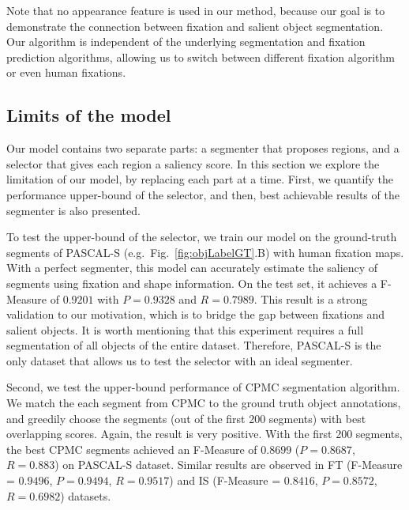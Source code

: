 Note that no appearance feature is used in our method, because our goal is to demonstrate the connection between fixation and salient object segmentation.  Our algorithm is independent of the underlying segmentation and fixation prediction algorithms, allowing us to switch between different fixation algorithm or even human fixations.


\subsection{Limits of the model}
Our model contains two separate parts: a segmenter that proposes regions, and a selector that gives each region a saliency score.  In this section we explore the limitation of our model, by replacing each part at a time.  First, we quantify the performance upper-bound of the selector, and then, best achievable results of the segmenter is also presented.

To test the upper-bound of the selector, we train our model on the ground-truth segments of PASCAL-S (e.g.\ Fig.~\ref{fig:objLabelGT}.B) with human fixation maps.  With a perfect segmenter, this model can accurately estimate the saliency of segments using fixation and shape information.  On the test set, it achieves a F-Measure of $0.9201$ with $P = 0.9328$ and $R = 0.7989$.  This result is a strong validation to our motivation, which is to bridge the gap between fixations and salient objects.  It is worth mentioning that this experiment requires a full segmentation of all objects of the entire dataset.  Therefore, PASCAL-S is the only dataset that allows us to test the selector with an ideal segmenter.

Second, we test the upper-bound performance of CPMC segmentation algorithm.  We match the each segment from CPMC to the ground truth object annotations, and greedily choose the segments (out of the first 200 segments) with best overlapping scores.  Again, the result is very positive.  With the first 200 segments, the best CPMC segments achieved an F-Measure of $0.8699$ ($P = 0.8687$, $R = 0.883$) on PASCAL-S dataset.  Similar results are observed in FT (F-Measure = $0.9496$, $P = 0.9494$, $R = 0.9517$) and IS (F-Measure = $0.8416$, $P = 0.8572$, $R = 0.6982$) datasets.



